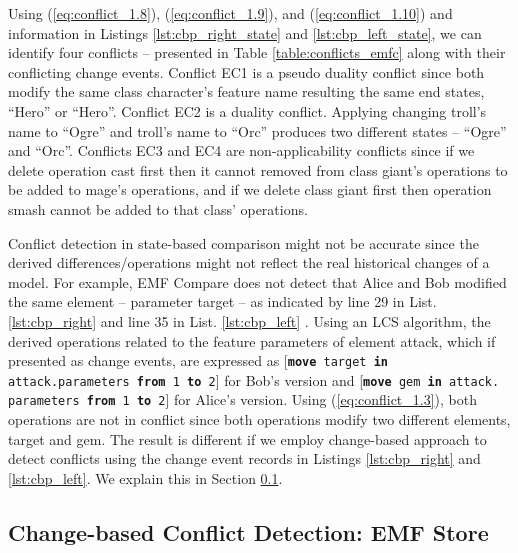 Using (\ref{eq:conflict_1.8}), (\ref{eq:conflict_1.9}), and (\ref{eq:conflict_1.10}) and information in Listings \ref{lst:cbp_right_state} and \ref{lst:cbp_left_state}, we can identify four conflicts -- presented in Table \ref{table:conflicts_emfc} along with their conflicting change events. Conflict \textsf{EC1} is a pseudo duality conflict since both modify the same class \textsf{character}'s feature \textsf{name} resulting the same end states, ``Hero'' or ``Hero''. Conflict \textsf{EC2} is a duality conflict. Applying changing \textsf{troll}'s \textsf{name} to ``Ogre'' and \textsf{troll}'s \textsf{name} to ``Orc'' produces two different states -- ``Ogre'' and ``Orc''. Conflicts \textsf{EC3} and \textsf{EC4} are non-applicability conflicts since if we delete operation \textsf{cast} first then it cannot removed from class \textsf{giant}'s operations to be added to \textsf{mage}'s \textsf{operations}, and if we delete class \textsf{giant} first then operation \textsf{smash} cannot be added to that class' operations.

Conflict detection in state-based comparison might not be accurate since the derived differences/operations might not reflect the real historical changes of a model.
For example, EMF Compare does not detect that Alice and Bob modified the same element -- parameter \textsf{target} -- as indicated by line 29 in List. \ref{lst:cbp_right} and line 35 in List. \ref{lst:cbp_left} . Using an LCS algorithm, the derived operations related to the feature \textsf{parameters} of element \textsf{attack}, which if presented as change events, are expressed as [\texttt{\small \textbf{move} target \textbf{in} attack.parameters \textbf{from} 1 \textbf{to} 2}] for Bob's version and [\texttt{\small \textbf{move} gem \textbf{in} attack. parameters \textbf{from} 1 \textbf{to} 2}] for Alice's version. Using (\ref{eq:conflict_1.3}), both operations are not in conflict since both operations modify two different elements, \textsf{target} and \textsf{gem}. The result is different if we employ change-based approach to detect conflicts using the change event records in Listings \ref{lst:cbp_right} and \ref{lst:cbp_left}. We explain this in Section \ref{sec:change_based_conflict_detection_emf_store}.

\subsection{Change-based Conflict Detection: EMF Store}
\label{sec:change_based_conflict_detection_emf_store}

